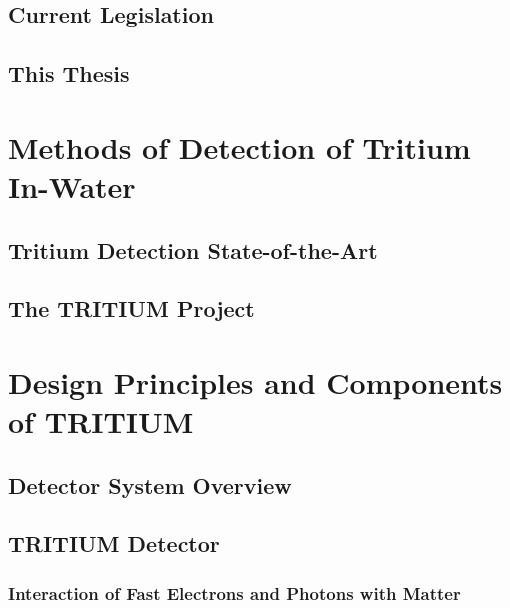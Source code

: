 \documentclass[12pt,a4paper]{book}
\begin{document}
	\section{Current Legislation}\label{sec:Legislation}
	 
	
	\section{This Thesis}\label{sec:ThisThesis}
	
	\newpage
	
\chapter{Methods of Detection of Tritium In-Water}\label{chap:TritiumDetection}
	
	\section{Tritium Detection State-of-the-Art}\label{sec:StateOfTheArt}
	
	
	\section{The TRITIUM Project}\label{sec:TritiumProject}
	
	\newpage	
	
\chapter{Design Principles and Components of TRITIUM}\label{chap:DesignPrinciples}
	\section{Detector System Overview}\label{sec:MonitorOverview}
	 
	
	\section{TRITIUM Detector}\label{sec:TritiumDectectorIntro}
	 
	
		\subsection[Interaction of Particles with Matter]{Interaction of Fast Electrons and Photons with Matter}\label{subsec:Interaction}
		 
					
\end{document}
